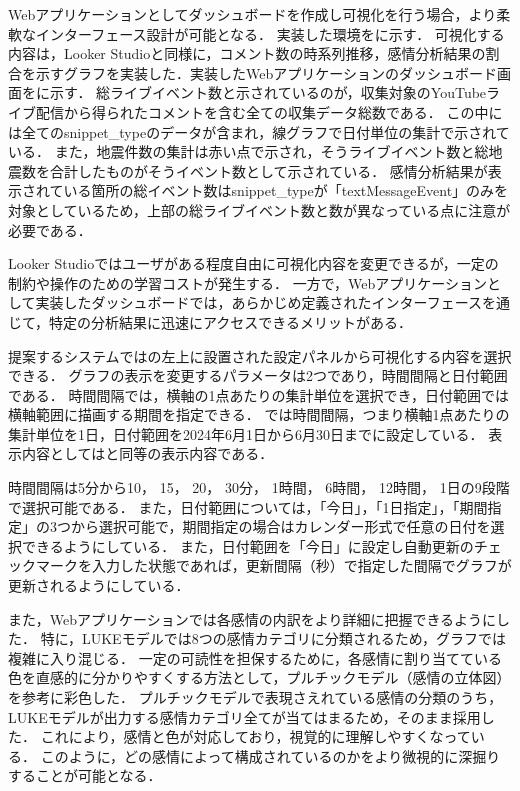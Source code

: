   
  Webアプリケーションとしてダッシュボードを作成し可視化を行う場合，より柔軟なインターフェース設計が可能となる．
  実装した環境をに示す．
  可視化する内容は，Looker Studioと同様に，コメント数の時系列推移，感情分析結果の割合を示すグラフを実装した．実装したWebアプリケーションのダッシュボード画面をに示す．
  総ライブイベント数と示されているのが，収集対象のYouTubeライブ配信から得られたコメントを含む全ての収集データ総数である．
  この中には全てのsnippet\_typeのデータが含まれ，線グラフで日付単位の集計で示されている．
  また，地震件数の集計は赤い点で示され，そうライブイベント数と総地震数を合計したものがそうイベント数として示されている．
  感情分析結果が表示されている箇所の総イベント数はsnippet\_typeが「textMessageEvent」のみを対象としているため，上部の総ライブイベント数と数が異なっている点に注意が必要である．

  \clearpage

  

  
  
  \clearpage

  Looker Studioではユーザがある程度自由に可視化内容を変更できるが，一定の制約や操作のための学習コストが発生する．
  一方で，Webアプリケーションとして実装したダッシュボードでは，あらかじめ定義されたインターフェースを通じて，特定の分析結果に迅速にアクセスできるメリットがある．
  
  提案するシステムではの左上に設置された設定パネルから可視化する内容を選択できる．
  グラフの表示を変更するパラメータは2つであり，時間間隔と日付範囲である．
  時間間隔では，横軸の1点あたりの集計単位を選択でき，日付範囲では横軸範囲に描画する期間を指定できる．
  では時間間隔，つまり横軸1点あたりの集計単位を1日，日付範囲を2024年6月1日から6月30日までに設定している．
  表示内容としてはと同等の表示内容である．
  
  時間間隔は5分から10， 15， 20， 30分， 1時間， 6時間， 12時間， 1日の9段階で選択可能である．
  また，日付範囲については，「今日」，「1日指定」，「期間指定」の3つから選択可能で，期間指定の場合はカレンダー形式で任意の日付を選択できるようにしている．
  また，日付範囲を「今日」に設定し自動更新のチェックマークを入力した状態であれば，更新間隔（秒）で指定した間隔でグラフが更新されるようにしている．

  また，Webアプリケーションでは各感情の内訳をより詳細に把握できるようにした．
  特に，LUKEモデルでは8つの感情カテゴリに分類されるため，グラフでは複雑に入り混じる．
  一定の可読性を担保するために，各感情に割り当てている色を直感的に分かりやすくする方法として，プルチックモデル（感情の立体図）を参考に彩色した\cite{plutchik1980_psychoevolutionary, plutchik1980_psychoevolutionary_synthesis}．
  プルチックモデルで表現さえれている感情の分類のうち，LUKEモデルが出力する感情カテゴリ全てが当てはまるため，そのまま採用した．
  これにより，感情と色が対応しており，視覚的に理解しやすくなっている．
  このように，どの感情によって構成されているのかをより微視的に深掘りすることが可能となる．

